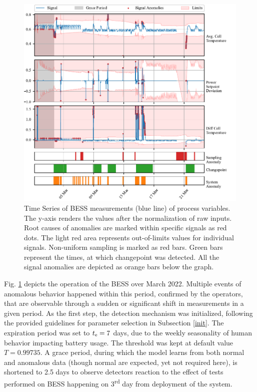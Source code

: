 \begin{figure}[htbp]
\centerline{\includegraphics{figures/BESS_thresh.pdf}}
\caption{Time Series of BESS measurements (blue line) of process variables. The y-axis renders the values after the normalization of raw inputs. Root causes of anomalies are marked within specific signals as red dots. The light red area represents out-of-limits values for individual signals. Non-uniform sampling is marked as red bars. Green bars represent the times, at which changepoint was detected. All the signal anomalies are depicted as orange bars below the graph.}
\label{fig:bess}
\end{figure}

Fig. \ref{fig:bess} depicts the operation of the BESS over March 2022. Multiple events of anomalous behavior happened within this period, confirmed by the operators, that are observable through a sudden or significant shift in measurements in a given period. As the first step, the detection mechanism was initialized, following the provided guidelines for parameter selection in Subsection \ref{init}. The expiration period was set to $t _{\text{e}} = 7$ days, due to the weekly seasonality of human behavior impacting battery usage. The threshold was kept at default value $T = 0.99735$. A grace period, during which the model learns from both normal and anomalous data (though normal are expected, yet not required here), is shortened to 2.5 days to observe detectors reaction to the effect of tests performed on BESS happening on 3\textsuperscript{rd} day from deployment of the system.

